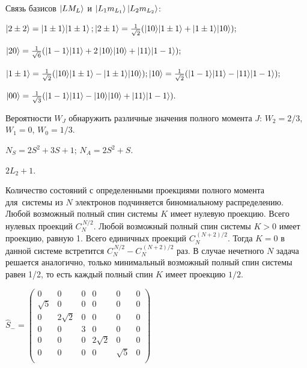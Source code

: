  Связь базисов $\ket{L M_L}$ и $\ket{L_1 m_{L_1}}\ket{L_2 m_{L_2}}$:\par
\vspace{-\parskip+1mm}
$\ket{2\pm2}=\ket{1\pm1}\!\ket{1\pm1};$\quad $\ket{2\pm1} = \frac{1}{\sqrt2}(\ket{10}\!\ket{1\pm1} + \ket{1\pm1}\!\ket{10});$\par
\vspace{-\parskip+1mm}
$\ket{20} = \frac{1}{\sqrt6}(\ket{1-1}\!\ket{11} + 2\ket{10}\!\ket{10}+\ket{11}\!\ket{1-1});$\par
\vspace{-\parskip+1mm}
$\ket{1\pm1} = \frac{1}{\sqrt2}(\ket{10}\!\ket{1\pm1} - \ket{1\pm1}\!\ket{10});$\quad$\ket{10} = \frac{1}{\sqrt2}(\ket{1-1}\!\ket{11} - \ket{11}\!\ket{1-1});$\par
\vspace{-\parskip+1mm}
$\ket{00} = \frac{1}{\sqrt3}(\ket{1-1}\!\ket{11} - \ket{10}\!\ket{10}+\ket{11}\!\ket{1-1}).$\par
\vspace{-\parskip+1mm}
Вероятности $W_J$ обнаружить различные значения полного момента $J$: $W_{2} = 2/3$, $W_{1} = 0$, $W_{0} = 1/3$.
\par
{} $N_S = 2S^2+3S+1$; $N_A= 2S^2+S$.\par
{} $2L_2+1$.\par
{} Количество состояний с определенными проекциями полного момента для~системы из $N$ электронов подчиняется биномиальному распределению. Любой возможный полный спин системы $K$ имеет нулевую проекцию. Всего нулевых проекций $C_{N}^{\,N/2}$. Любой возможный полный спин системы $K>0$ имеет проекцию, равную 1. Всего единичных проекций $C_{N}^{\,(N+2)/2}$. Тогда $K=0$ в данной системе встретится $C_{N}^{\,N/2} - C_{N}^{\,(N+2)/2}$ раз. В случае нечетного $N$ задача решается аналогично, только минимальный возможный полный спин системы равен 1/2, то есть каждый полный спин $K$ имеет проекцию $1/2$. \par
{} $\widehat{S}_-=\begin{pmatrix}
0 & 0 & 0 & 0 & 0 & 0 \\
\sqrt{5} & 0 & 0 & 0 & 0 & 0\\
0 & 2\sqrt{2} & 0 & 0 & 0 & 0\\
0 & 0 & 3 & 0 & 0 & 0\\
0 & 0 & 0 & 2\sqrt{2} & 0 & 0\\
0 & 0 & 0 & 0 & \sqrt{5} & 0\\
\end{pmatrix}$
